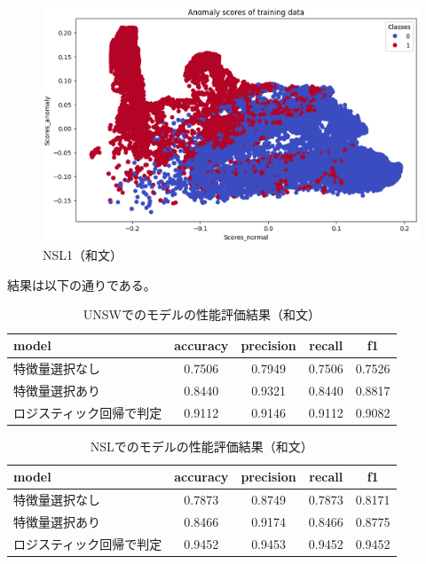 \documentclass{css}
\begin{document}
\begin{figure}[tb]
    \centering
    \includegraphics[width=\linewidth]{pictures/eps/NSL1.eps}
    \caption{NSL1（和文）}
    \label{fig:NSL1}
\end{figure}

結果は以下の通りである。

\begin{table}[tb]
    \caption{UNSWでのモデルの性能評価結果（和文）}
    \centering
    \footnotesize
    \begin{tabular}{lcccc}
        \hline\hline
        model & accuracy & precision & recall & f1 \\
        \hline
        特徴量選択なし & 0.7506 & 0.7949 & 0.7506 & 0.7526 \\
        特徴量選択あり & 0.8440 & 0.9321 & 0.8440 & 0.8817 \\
        ロジスティック回帰で判定 & 0.9112 & 0.9146 & 0.9112 & 0.9082 \\
        \hline
    \end{tabular}
    \label{tab:model_performance}
\end{table}

\begin{table}[tb]
    \caption{NSLでのモデルの性能評価結果（和文）}
    \centering
    \footnotesize
    \begin{tabular}{lcccc}
        \hline\hline
        model & accuracy & precision & recall & f1 \\
        \hline
        特徴量選択なし & 0.7873 & 0.8749 & 0.7873 & 0.8171 \\
        特徴量選択あり & 0.8466 & 0.9174 & 0.8466 & 0.8775 \\
        ロジスティック回帰で判定 & 0.9452 & 0.9453 & 0.9452 & 0.9452 \\
        \hline
    \end{tabular}
    \label{tab:model_performance}
\end{table}
\end{document}
